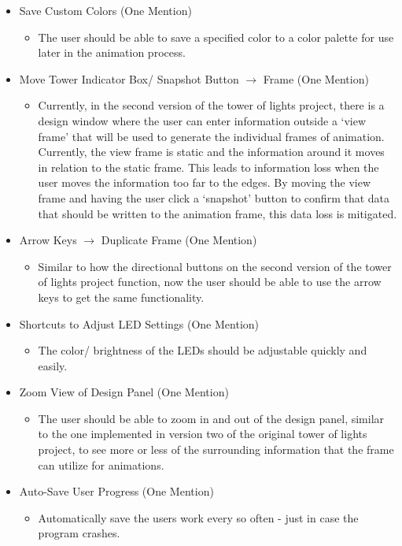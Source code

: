 \documentclass[12pt]{extarticle}
\begin{document}
{\begin{itemize}
\begin{itemize}
		\item The frames of the animation should be visible and the user should be able to scroll through them all.
	\end{itemize}
	\item Save Custom Colors (One Mention)
	\begin{itemize}
		\item The user should be able to save a specified color to a color palette for use later in the animation process.
	\end{itemize}
	\item Move Tower Indicator Box/ Snapshot Button $\rightarrow$ Frame (One Mention)
	\begin{itemize}
		\item Currently, in the second version of the tower of lights project, there is a design window where the user can enter information outside a `view frame' that will be used to generate the individual frames of animation. Currently, the view frame is static and the information around it moves in relation to the static frame. This leads to information loss when the user moves the information too far to the edges. By moving the view frame and having the user click a `snapshot' button to confirm that data that should be written to the animation frame, this data loss is mitigated.
	\end{itemize}
	\item Arrow Keys $\rightarrow$ Duplicate Frame (One Mention)
	\begin{itemize}
		\item Similar to how the directional buttons on the second version of the tower of lights project function, now the user should be able to use the arrow keys to get the same functionality.
	\end{itemize}
	\item Shortcuts to Adjust LED Settings (One Mention)
	\begin{itemize}
		\item The color/ brightness of the LEDs should be adjustable quickly and easily.
	\end{itemize}
	\item Zoom View of Design Panel (One Mention)
	\begin{itemize}
		\item The user should be able to zoom in and out of the design panel, similar to the one implemented in version two of the original tower of lights project, to see more or less of the surrounding information that the frame can utilize for animations. 
	\end{itemize}
	\item Auto-Save User Progress (One Mention)
	\begin{itemize}
		\item Automatically save the users work every so often - just in case the program crashes.
	\end{itemize}
\end{itemize}}
\end{document}
